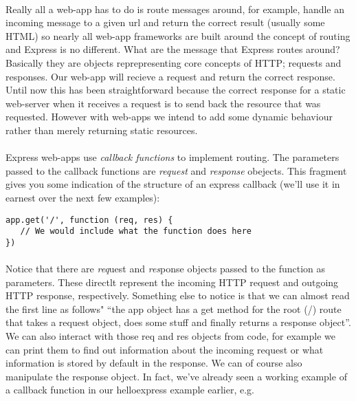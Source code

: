 \documentclass[10pt, a4paper, twosize]{article}
\begin{document}
\paragraph{} Really all a web-app has to do is route messages around, for example, handle an incoming message to a given url and return the correct result (usually some HTML) so nearly all web-app frameworks are built around the concept of routing and Express is no different. What are the message that Express routes around? Basically they are objects reprepresenting core concepts of HTTP; requests and responses. Our web-app will recieve a request and return the correct response. Until now this has been straightforward because the correct response for a static web-server when it receives a request is to send back the resource that was requested. However with web-apps we intend to add some dynamic behaviour rather than merely returning static resources.

\paragraph{} Express web-apps use \emph{callback functions} to implement routing. The parameters passed to the callback functions are \emph{request} and \emph{response} obejects. This fragment gives you some indication of the structure of an express callback (we'll use it in earnest over the next few examples):

\begin{lstlisting}
app.get('/', function (req, res) {
   // We would include what the function does here
})
\end{lstlisting}

\paragraph{} Notice that there are \emph{req}uest and \emph{res}ponse objects passed to the function as parameters. These directlt represent the incoming HTTP request and outgoing HTTP response, respectively. Something else to notice is that we can almost read the first line as follows" ``the app object has a get method for the root (/) route that takes a request object, does some stuff and finally returns a response object''. We can also interact with those req and res objects from code, for example we can print them to find out information about the incoming request or what information is stored by default in the response. We can of course also manipulate the response object. In fact, we've already seen a working example of a callback function in our helloexpress example earlier, e.g.
\end{document}
